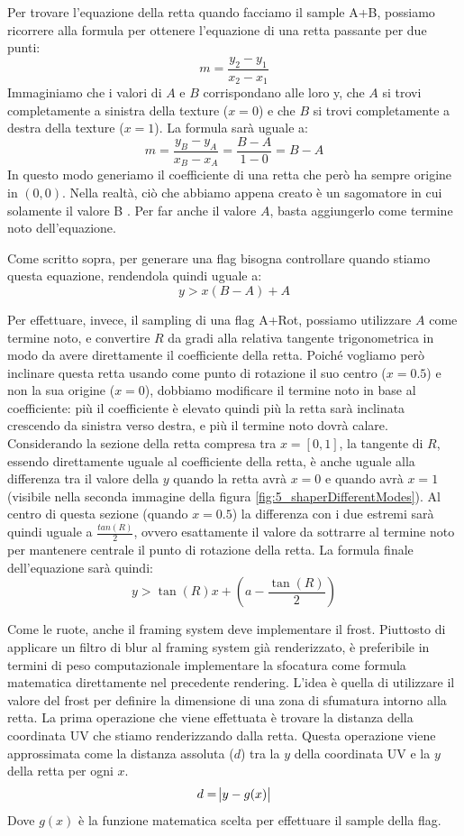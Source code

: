 \documentclass[main.tex]{subfiles}
\begin{document}
Per trovare l'equazione della retta quando facciamo il sample A+B, possiamo ricorrere alla formula per ottenere l'equazione di una retta passante per due punti:
\[m = \frac{y_2 - y_1}{x_2 - x_1}\]
Immaginiamo che i valori di $A$ e $B$ corrispondano alle loro y, che $A$ si trovi completamente a sinistra della texture ($x = 0$) e che $B$ si trovi completamente a destra della texture ($x = 1$). La formula sarà uguale a:
\[m = \frac{y_B - y_A}{x_B - x_A} = \frac{B - A}{1 - 0} = B - A\]
In questo modo generiamo il coefficiente di una retta che però ha sempre origine in $(0, 0)$. Nella realtà, ciò che abbiamo appena creato è un sagomatore in cui solamente il valore B . Per far  anche il valore $A$, basta aggiungerlo come termine noto dell'equazione.

Come scritto sopra, per generare una flag bisogna controllare quando stiamo  questa equazione, rendendola quindi uguale a:
\[y > x(B - A) + A\]
\newline

Per effettuare, invece, il sampling di una flag A+Rot, possiamo utilizzare $A$ come termine noto, e convertire $R$ da gradi alla relativa tangente trigonometrica in modo da avere direttamente il coefficiente della retta. Poiché vogliamo però inclinare questa retta usando come punto di rotazione il suo centro ($x = 0.5$) e non la sua origine ($x = 0$), dobbiamo modificare il termine noto in base al coefficiente: più il coefficiente è elevato quindi più la retta sarà inclinata crescendo da sinistra verso destra, e più il termine noto dovrà calare. Considerando la sezione della retta compresa tra $x = [0, 1]$, la tangente di $R$, essendo direttamente uguale al coefficiente della retta, è anche uguale alla differenza tra il valore della $y$ quando la retta avrà $x = 0$ e quando avrà $x = 1$ (visibile nella seconda immagine della figura \ref{fig:5_shaperDifferentModes}). Al centro di questa sezione (quando $x = 0.5$) la differenza con i due estremi sarà quindi uguale a $\frac{tan(R)}{2}$, ovvero esattamente il valore da sottrarre al termine noto per mantenere centrale il punto di rotazione della retta. La formula finale dell'equazione sarà quindi:
\[y > \tan(R)x + (a - \frac{\tan(R)}{2})\]

Come le ruote, anche il framing system deve implementare il frost. Piuttosto di applicare un filtro di blur al framing system già renderizzato, è preferibile in termini di peso computazionale implementare la sfocatura come formula matematica direttamente nel precedente rendering. L'idea è quella di utilizzare il valore del frost per definire la dimensione di una zona di sfumatura intorno alla retta. La prima operazione che viene effettuata è trovare la distanza della coordinata UV che stiamo renderizzando dalla retta. Questa operazione viene approssimata come la distanza assoluta ($d$) tra la $y$ della coordinata UV e la $y$ della retta per ogni $x$.
\[d = \abs{y - g(x)}\]
Dove $g(x)$ è la funzione matematica scelta per effettuare il sample della flag.
\end{document}
